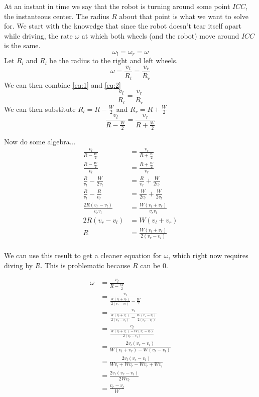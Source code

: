 \documentclass{article}
\begin{document}
At an instant in time we say that the robot is turning around some point $ICC$, the instanteous center. The radius $R$ about that point is what we want to solve for. We start with the knowedge that since the robot doesn't tear itself apart while driving, the rate $\omega$ at which both wheels (and the robot) move around $ICC$ is the same.
\begin{equation} \label{eq:1}
  \omega_l = \omega_r = \omega
\end{equation}
Let $R_l$ and $R_l$ be the radius to the right and left wheels.
\begin{equation} \label{eq:2}
  \omega = \frac{v_l}{R_l} = \frac{v_r}{R_r}
\end{equation}
We can then combine \ref{eq:1} and \ref{eq:2}
\begin{equation}
  \frac{v_l}{R_l} = \frac{v_r}{R_r}
\end{equation}
We can then substitute $R_l = R - \frac{W}{2}$ and $R_r = R + \frac{W}{2}$
\begin{equation}
  \frac{v_l}{R-\frac{W}{2}} = \frac{v_r}{R + \frac{W}{2}}
\end{equation}

Now do some algebra...
\begin{align*}
  \frac{v_l}{R-\frac{W}{2}} &= \frac{v_r}{R + \frac{W}{2}} \\[1em]
  \frac{R-\frac{W}{2}}{v_l} &= \frac{R + \frac{W}{2}}{v_r} \\[1em]
  \frac{R}{v_l}-\frac{W}{2v_l} &= \frac{R}{v_r} + \frac{W}{2v_r} \\[1em]
  \frac{R}{v_l}-\frac{R}{v_r} &= \frac{W}{2v_r}+\frac{W}{2v_l} \\[1em]
  \frac{2R(v_r-v_l)}{v_rv_l} &= \frac{W(v_l+v_r)}{v_rv_l} \\[1em]
  2R(v_r-v_l) &= W(v_l+v_r) \\[1em]
  R &= \frac{W(v_l+v_r)}{2(v_r-v_l)} \\[1em]
\end{align*}

We can use this result to get a cleaner equation for $\omega$, which right now requires diving by $R$. This is problematic because $R$ can be $0$.

\begin{align*}
  \omega &= \frac{v_l}{R-\frac{W}{2}}\\[1em]
         &= \frac{v_l}{\frac{W(v_l+v_r)}{2(v_r - v_l)}-\frac{W}{2}}\\[1em]
         &= \frac{v_l}{\frac{W(v_l+v_r)}{2(v_r - v_l)}-\frac{W(v_r - v_l)}{2(v_r - v_l)}}\\[1em]
         &= \frac{v_l}{\frac{W(v_l+v_r)-W(v_r - v_l)}{2(v_r - v_l)}}\\[1em]
         &= \frac{2v_l(v_r - v_l)}{W(v_l+v_r)-W(v_r - v_l)}\\[1em]
         &= \frac{2v_l(v_r - v_l)}{Wv_l+Wv_r-Wv_r+Wv_l}\\[1em]
         &= \frac{2v_l(v_r - v_l)}{2Wv_l}\\[1em]
         &= \frac{v_r - v_l}{W}\\[1em]
\end{align*}
\end{document}

